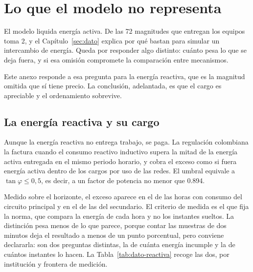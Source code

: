 %
%
\section{Lo que el modelo no representa}
\label{sec:no-representado}
\justifying

El modelo liquida energía activa. De las 72 magnitudes que entregan
los equipos toma 2, y el Capítulo~\ref{sec:dato} explica por qué bastan
para simular un intercambio de energía. Queda por
responder algo distinto: cuánto pesa lo que se deja fuera, y si esa
omisión compromete la comparación entre mecanismos.

Este anexo responde a esa pregunta para la energía reactiva, que es la
magnitud omitida que sí tiene precio. La conclusión, adelantada, es que el
cargo es apreciable y el ordenamiento sobrevive.

\subsection{La energía reactiva y su cargo}
\label{sub:anexo-reactiva}

Aunque la energía reactiva no entrega trabajo, se paga. La regulación
colombiana la factura cuando el consumo reactivo inductivo
supera la mitad de la energía activa entregada en el mismo periodo
horario, y cobra el exceso como si fuera energía activa dentro de los
cargos por uso de las redes. El umbral equivale a
$\tan\varphi \le 0{,}5$, es decir, a un factor de potencia no menor que
\num{0,894}.

Medido sobre el horizonte, el exceso aparece en el  de las horas
con consumo del circuito principal y en el  de las del
secundario. El criterio de medida es el que fija la norma, que compara la
energía de cada hora y no los instantes sueltos. La distinción pesa menos
de lo que parece, porque contar las muestras de dos minutos deja el
resultado a menos de un punto porcentual, pero conviene declararla: son
dos preguntas distintas, la de cuánta energía incumple y la de cuántos
instantes lo hacen. La Tabla~\ref{tab:dato-reactiva} recoge las dos, por
institución y frontera de medición.

